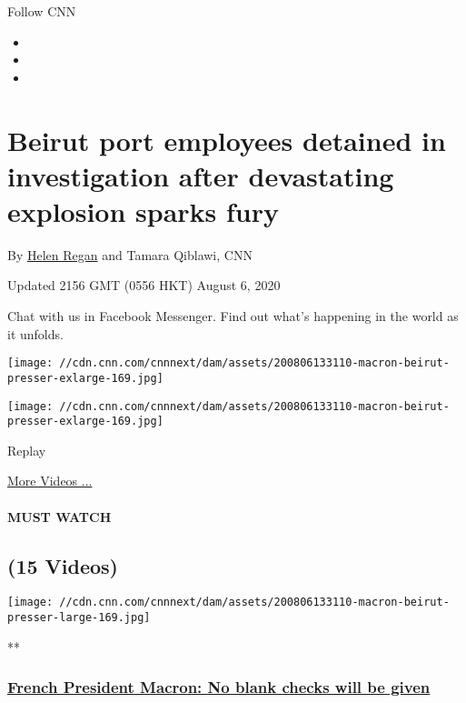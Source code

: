 Follow CNN

\begin{itemize}
\item
\item
\item
\end{itemize}

\hypertarget{beirut-port-employees-detained-in-investigation-after-devastating-explosion-sparks-fury}{%
\section{Beirut port employees detained in investigation after
devastating explosion sparks
fury}\label{beirut-port-employees-detained-in-investigation-after-devastating-explosion-sparks-fury}}

By \href{/profiles/helen-regan}{Helen Regan} and Tamara Qiblawi, CNN

Updated 2156 GMT (0556 HKT) August 6, 2020

Chat with us in Facebook Messenger. Find out what's happening in the
world as it unfolds.

\texttt{[image: //cdn.cnn.com/cnnnext/dam/assets/200806133110-macron-beirut-presser-exlarge-169.jpg]}

\texttt{[image: //cdn.cnn.com/cnnnext/dam/assets/200806133110-macron-beirut-presser-exlarge-169.jpg]}\href{javascript:void(0);}{}

Replay

\href{/videos}{More Videos ...}

\hypertarget{must-watch}{%
\paragraph{MUST WATCH}\label{must-watch}}

\hypertarget{15-videos}{%
\subsection{(15 Videos)}\label{15-videos}}

\href{/videos/world/2020/08/06/emmanuel-macron-lebanon-leaders-blank-check-sot-vpx.afptv/video/playlists/around-the-world/}{}

\texttt{[image: //cdn.cnn.com/cnnnext/dam/assets/200806133110-macron-beirut-presser-large-169.jpg]}

**

\hypertarget{french-president-macron-no-blank-checks-will-be-given}{%
\subsubsection{\texorpdfstring{\href{/videos/world/2020/08/06/emmanuel-macron-lebanon-leaders-blank-check-sot-vpx.afptv/video/playlists/around-the-world/}{French
President Macron: No blank checks will be
given}}{French President Macron: No blank checks will be given}}\label{french-president-macron-no-blank-checks-will-be-given}}

